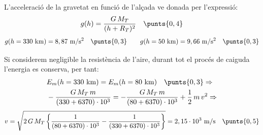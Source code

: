 \begin{solapartat}
L'acceleració de la gravetat en funció de l'alçada ve donada per l'expressió:
\[ g(h) = \frac{G\,M_T}{(h + R_T)^2} \quad\punts{0,4} \]
\[ g(h = 330\ \mathrm{km}) = 8,87\ \mathrm{m/s^2} \quad\punts{0,3} \qquad g(h = 50\ \mathrm{km}) = 9,66\ \mathrm{m/s^2} \quad\punts{0,3} \]
\end{solapartat}

\begin{solapartat}
Si considerem negligible la resistència de l'aire, durant tot el procés de caiguda l'energia es conserva,  per tant:
\begin{align*}
&E_m(h = 330\ \mathrm{km}) = E_m(h = 80\ \mathrm{km}) \quad\punts{0,3} \Rightarrow\\
&-\frac{G\,M_T\,m}{(330 + 6370)\cdot 10^{3}} = -\frac{G\,M_T\,m}{(80 + 6370)\cdot 10^{3}} + \frac{1}{2}\,m\,v^2 \Rightarrow
\end{align*}
\[ v = \sqrt{2\,G\,M_T\left\{\frac{1}{(80 + 6370)\cdot 10^{3}} - \frac{1}{(330 + 6370)\cdot 10^{3}}\right\}} = 2,15\cdot 10^{3}\ \mathrm{m/s} \quad\punts{0,5} \]
\end{solapartat}
